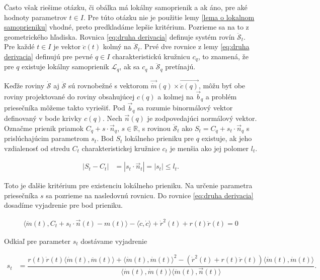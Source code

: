 Často však riešime otázku, či obálka má lokálny samoprienik a ak áno, pre aké hodnoty parametrov $t \in I$. Pre túto otázku nie je použitie lemy \ref{lema o lokalnom samoprieniku} vhodné, preto predkladáme lepšie kritérium. Pozrieme sa na to z geometrického hľadiska. Rovnica \ref{eq:druha derivacia} definuje systém rovín $\mathcal{\ddot{S}}_t$. Pre každé $t \in I$ je vektor $\ddot{c}(t)$ kolmý na $\mathcal{\ddot{S}}_t.$ Prvé dve rovnice z lemy \ref{eq:druha derivacia} definujú pre pevné $q \in I$ charakteristickú kružnicu $c_q$, to znamená, že pre $q$ existuje lokálny samoprienik $\mathcal{L}_q$, ak sa $c_q$ a $\mathcal{\ddot{S}}_q$ pretínajú. 

Keďže roviny $\mathcal{\dot{S}}$ aj $\mathcal{\ddot{S}}$ sú rovnobežné s vektorom $ \vec{\dot{m}}(q) \times \vec{\ddot{c}(q)} $, môžu byť obe roviny projektované do roviny obsahujúcej $ c(q) $ a kolmej na $ \vec{b}_q $ a problém priesečníka môžeme takto vyriešiť. Pod $ \vec{b}_q $ sa rozumie binormálový vektor definovaný v bode krivky $ c(q) $. Nech $\vec{n}(q)$ je zodpovedajúci normálový vektor. Označme prienik priamok $C_q + s \cdot \vec{n}_q$, $s \in \mathbb{R}$, s rovinou $\mathcal{\ddot{S}}_t$ ako $S_t = C_q + s_t \cdot \vec{n}_q$ s prislúchajúcim parametrom $s_t$. Bod $S_t$ lokálneho prieniku pre $q$ existuje, ak jeho vzdialenosť od stredu $C_t$ charakteristickej kružnice $c_t$ je menšia ako jej polomer $l_t.$ 

\begin{align*}
| S_t - C_t | &= | s_t \cdot \vec{n}_t | = | s_t | \leq l_t.
\end{align*}

Toto je ďalšie kritérium pre existenciu lokálneho prieniku. Na určenie parametra priesečníka $ s $ sa pozrieme na nasledovnú rovnicu. Do rovnice \ref{eq:druha derivacia} dosadíme vyjadrenie pre bod prieniku.

\begin{align*}
\langle \ddot{m}(t), C_t + s_t \cdot \vec{n}(t) - m(t) \rangle - \langle \dot{c}, \dot{c}\rangle + \dot{r}^2(t) + r(t)\ddot{r}(t) = 0
\end{align*}

Odkiaľ pre parameter $ s_t $ dostávame vyjadrenie

\begin{align*}
s_t &= \dfrac{ r(t) \dot{r}(t) \langle \dot{m}(t), \ddot{m}(t) \rangle + \langle \dot{m}(t), \dot{m}(t) \rangle^2 - \left( \dot{r}^2(t) + r(t)\ddot{r}(t) \right) \langle \dot{m}(t), \dot{m}(t) \rangle}{\langle \dot{m}(t), \dot{m}(t) \rangle \langle \ddot{m}(t) , \vec{n}(t) \rangle}.
\end{align*}

